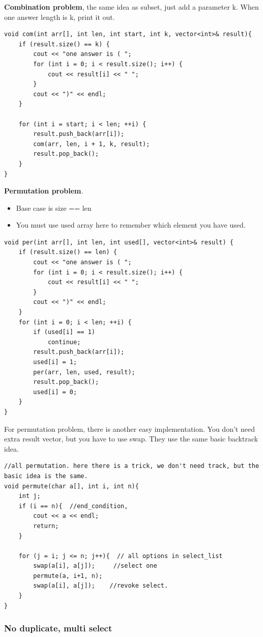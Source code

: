 \documentclass[a4paper,11pt,twoside]{book}
\begin{document}
	\par \textbf{Combination problem}, the same idea as subset, just add a parameter k. When one answer length is k, print it out. 
	
\begin{lstlisting}
void com(int arr[], int len, int start, int k, vector<int>& result){
	if (result.size() == k) {
		cout << "one answer is ( ";
		for (int i = 0; i < result.size(); i++) {
			cout << result[i] << " ";
		}
		cout << ")" << endl;
	}
	
	for (int i = start; i < len; ++i) {
		result.push_back(arr[i]);  
		com(arr, len, i + 1, k, result);
		result.pop_back();
	}
}	
\end{lstlisting}

	\par \textbf{Permutation problem}. 
	
\begin{itemize}
	\item Base case is size == len
	\item You must use used array here to remember which element you have used. 
\end{itemize}
\begin{lstlisting}
void per(int arr[], int len, int used[], vector<int>& result) {
	if (result.size() == len) {
		cout << "one answer is ( ";
		for (int i = 0; i < result.size(); i++) {
			cout << result[i] << " ";
		}
		cout << ")" << endl;
	}
	for (int i = 0; i < len; ++i) {
		if (used[i] == 1)
			continue;
		result.push_back(arr[i]); 
		used[i] = 1;
		per(arr, len, used, result);
		result.pop_back();
		used[i] = 0;
	}
}	
\end{lstlisting}
	\par For permutation problem, there is another easy implementation. You don't need extra result vector, but you have to use swap. They use the same basic backtrack idea.
\begin{lstlisting}
//all permutation. here there is a trick, we don't need track, but the basic idea is the same. 
void permute(char a[], int i, int n){
	int j;
	if (i == n){  //end_condition, 
		cout << a << endl;
		return;
	}
	
	for (j = i; j <= n; j++){  // all options in select_list
		swap(a[i], a[j]);     //select one
		permute(a, i+1, n);
		swap(a[i], a[j]);    //revoke select.
	}
} 	
\end{lstlisting}



\subsubsection{No duplicate, multi select}
\end{document}
